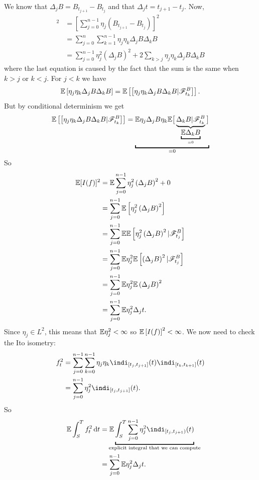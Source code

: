 \documentclass[crop=false, class=article]{standalone}
\begin{document}
\begin{fancyproof}
	We know that $\Delta_j B=B_{t_{j+1}}-B_{t_{j}}$ and that $\Delta_j t=t_{j+1}-t_j$. Now,
	\begin{align*}
		[I(f)]^{2} & =\left[\sum_{j=0}^{n-1}\eta_j\left(B_{t_{j+1}}-B_{t_{j}}\right)\right]^{2} \\
		 & =\sum_{j=0}^{n}\sum_{k=1}^{n-1}\eta_j\eta_k\Delta_jB\Delta_kB\\
		 &=\sum_{j=0}^{n-1}\eta_j^2\left(\Delta_jB\right)^{2}+2\sum_{k>j}\eta_j\eta_k\Delta_jB\Delta_kB
	\end{align*}
	where the last equation is caused by the fact that the sum is the same when $k>j$ or $k<j$. For $j<k$ we have
	\begin{equation*}
		\mathbb{E}\left[\eta_j\eta_k\Delta_jB\Delta_kB\right]=\mathbb{E}\left[\left[\eta_j\eta_k\Delta_jB\Delta_kB|\mathscr{F}^{B}_{t_{k}}\right]\right].
	\end{equation*}
	But by conditional determinism we get
	\begin{equation*}
			\ev\left[\left[\eta_j\eta_k\Delta_jB\Delta_kB|\F^{B}_{t_{k}}\right]\right] = \underbracket{\ev\eta_j\Delta_jB\eta_k\ev\big[\underbrace{\Delta_kB|\F^{B}_{t_{k}}}_{\underbracket{\ev\Delta_kB}_{=0}}\big] }_{=0}
	\end{equation*}
	So
	\begin{align*}
		\mathbb{E}[I(f)]^{2}&=\mathbb{E}\sum_{j=0}^{n-1}\eta_j^{2}\left(\Delta_jB\right)^{2}+0\\
		&=\sum_{j=0}^{n-1}\mathbb{E}\left[\eta_j^{2}\left(\Delta_jB\right)^{2}\right]\\
		&=\sum_{j=0}^{n-1}\mathbb{E}\mathbb{E}\left[\eta_j^{2}\left(\Delta_jB\right)^{2}|\mathscr{F}^{B}_{t_{j}}\right]\\
		&=\sum_{j=0}^{n-1}\mathbb{E}\eta_j^{2}\mathbb{E}\left[\left(\Delta_jB\right)^{2}|\mathscr{F}^{B}_{t_{j}}\right]\\
		&=\sum_{j=0}^{n-1}\mathbb{E}\eta_j^{2}\mathbb{E}\left(\Delta_{j}B\right)^{2}\\
		&=\sum_{j=0}^{n-1}\mathbb{E}\eta_j^{2}\Delta_{j}t.
	\end{align*}
	Since $\eta_j\in L^{2}$, this means that $\mathbb{E}\eta_j^2<\infty$ so $\mathbb{E}\left[I(f)\right]^2<\infty$. We now need to check the Ito isometry:
	\begin{align*}
		f^{2}_{t} & =\sum_{j=0}^{n-1}\sum_{k=0}^{n-1}\eta_j\eta_k\indi_{[t_{j},t_{j+1}]}(t)\indi_{[t_{k},t_{k+1}]}(t) \\
		 & =\sum_{j=0}^{n-1}\eta_j^2\indi_{[t_{j},t_{j+1}]}(t).
	\end{align*}
	So
	\begin{align*}
		\ev\int_S^Tf_{t}^{2}\dt & =\ev\underbracket{\int_{S}^T \sum_{j=0}^{n-1}\eta_j^2\indi_{[t_j,t_{j+1})}(t)}_{\mathclap{\text{explicit integral that we can compute}}}\\
		 & =\sum_{j=0}^{n-1}\ev\eta_j^2\Delta_jt.
	\end{align*}
\end{fancyproof}
\end{document}
